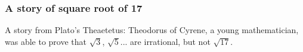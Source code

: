 \documentclass[aspectratio=169]{beamer}
\begin{document}
\begin{frame}
\frametitle{A story of square root of 17}
A story from Plato's Theaetetus: Theodorus of Cyrene, a young mathematician, was able to prove that $\sqrt{3}$, $\sqrt{5}$... are irrational, but not $\sqrt{17}$.

\begin{columns}
\begin{column}{0.5\textwidth}
    \begin{figure}[ht]\centering
    \end{figure}
\end{column}
\begin{column}{0.5\textwidth}
    \begin{figure}[ht]\centering

\end{figure}
\end{column}
\end{columns}
\end{frame}
\end{document}
